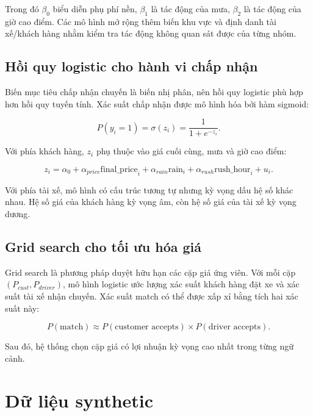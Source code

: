 \documentclass[12pt,a4paper]{report}
\begin{document}
Trong đó $\beta_0$ biểu diễn phụ phí nền, $\beta_1$ là tác động của mưa, $\beta_2$ là tác động của giờ cao điểm. Các mô hình mở rộng thêm biến khu vực và định danh tài xế/khách hàng nhằm kiểm tra tác động không quan sát được của từng nhóm.

\section{Hồi quy logistic cho hành vi chấp nhận}

Biến mục tiêu chấp nhận chuyến là biến nhị phân, nên hồi quy logistic phù hợp hơn hồi quy tuyến tính. Xác suất chấp nhận được mô hình hóa bởi hàm sigmoid:

\begin{equation}
    P(y_i=1) = \sigma(z_i) = \frac{1}{1 + e^{-z_i}}.
\end{equation}

Với phía khách hàng, $z_i$ phụ thuộc vào giá cuối cùng, mưa và giờ cao điểm:

\begin{equation}
    z_i = \alpha_0 + \alpha_{price} \text{final\_price}_i + \alpha_{rain}\text{rain}_i + \alpha_{rush}\text{rush\_hour}_i + u_i.
\end{equation}

Với phía tài xế, mô hình có cấu trúc tương tự nhưng kỳ vọng dấu hệ số khác nhau. Hệ số giá của khách hàng kỳ vọng âm, còn hệ số giá của tài xế kỳ vọng dương.

\section{Grid search cho tối ưu hóa giá}

Grid search là phương pháp duyệt hữu hạn các cặp giá ứng viên. Với mỗi cặp $(P_{cust}, P_{driver})$, mô hình logistic ước lượng xác suất khách hàng đặt xe và xác suất tài xế nhận chuyến. Xác suất match có thể được xấp xỉ bằng tích hai xác suất này:

\begin{equation}
    P(\text{match}) \approx P(\text{customer accepts}) \times P(\text{driver accepts}).
\end{equation}

Sau đó, hệ thống chọn cặp giá có lợi nhuận kỳ vọng cao nhất trong từng ngữ cảnh.

\chapter{Dữ liệu synthetic}
\end{document}
